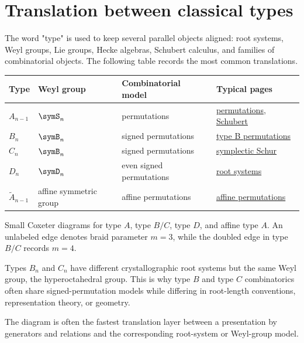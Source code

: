 \section[typeTranslation]{Translation between classical types}

The word "type" is used to keep several parallel objects aligned:
root systems, Weyl groups, Lie groups, Hecke algebras, Schubert calculus, and
families of combinatorial objects.  The following table records the most
common translations.

\begin{tabular}{llll}
\toprule
Type & Weyl group & Combinatorial model & Typical pages\\
\midrule
$A_{n-1}$
  & $\symS_n$
  & permutations
  & \hyperref[permutationMatrix]{permutations}, \hyperref[schubert]{Schubert}\\
$B_n$
  & $\symB_n$
  & signed permutations
  & \hyperref[permutationsTypeB]{type B permutations}\\
$C_n$
  & $\symB_n$
  & signed permutations
  & \hyperref[schurSymplectic]{symplectic Schur}\\
$D_n$
  & $\symD_n$
  & even signed permutations
  & \hyperref[weylLieGroups]{root systems}\\
$\widetilde A_{n-1}$
  & affine symmetric group
  & affine permutations
  & \hyperref[notationAffinePermutations]{affine permutations}\\
\bottomrule
\end{tabular}

\begin{example}

Small Coxeter diagrams for type \(A\), type \(B/C\), type \(D\), and affine
type \(A\).  An unlabeled edge denotes braid parameter \(m=3\), while the
doubled edge in type \(B/C\) records \(m=4\).
\end{example}

Types \(B_n\) and \(C_n\) have different crystallographic root systems but the
same Weyl group, the hyperoctahedral group.  This is why type \(B\) and type
\(C\) combinatorics often share signed-permutation models while differing in
root-length conventions, representation theory, or geometry.

The diagram is often the fastest translation layer between a presentation by
generators and relations and the corresponding root-system or Weyl-group
model.

